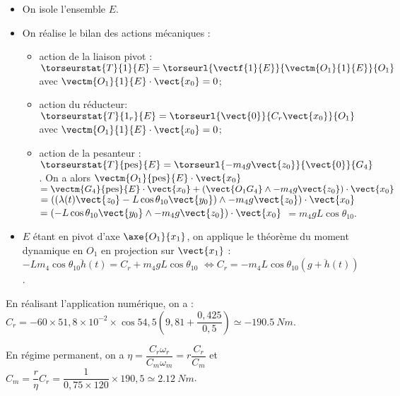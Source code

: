 \ifprof
\begin{corrige}
\begin{itemize}
\item On isole l'ensemble $E$.
\item On réalise le bilan des actions mécaniques : 
\begin{itemize}
\item action de la liaison pivot : $\torseurstat{T}{1}{E}=\torseurl{\vectf{1}{E}}{\vectm{O_1}{1}{E}}{O_1}$ avec $\vectm{O_1}{1}{E}\cdot \vect{x_0}=0$;
\item action du réducteur: $\torseurstat{T}{1_r}{E}=\torseurl{\vect{0}}{C_r \vect{x_0}}{O_1}$ avec $\vectm{O_1}{1}{E}\cdot \vect{x_0}=0$;
\item action de la pesanteur : 
$\torseurstat{T}{\text{pes}}{E}=\torseurl{-m_4g\vect{z_0}}{\vect{0}}{G_4}$. On a alors 
$\vectm{O_1}{\text{pes}}{E}\cdot \vect{x_0}$ $=\vectm{G_4}{\text{pes}}{E}\cdot \vect{x_0}+\left(\vect{O_1G_4}\wedge -m_4g\vect{z_0} \right)\cdot \vect{x_0}$  
$=\left(\left(\lambda(t)\vect{z_0}-L\cos\theta_{10}\vect{y_0}\right)\wedge -m_4g\vect{z_0} \right)\cdot \vect{x_0}$ 
$=\left(-L\cos\theta_{10}\vect{y_0}\wedge -m_4g\vect{z_0}\right)\cdot \vect{x_0}$ $= m_4gL\cos\theta_{10}$.
\end{itemize}
\item $E$ étant en pivot d'axe $\axe{O_1}{{x_1}}$, on applique le théorème du moment dynamique en $O_1$ en projection sur $\vect{x_1}$ :
$-Lm_4\cos\theta_{10}\ddot{h}(t) =C_r +m_4gL\cos\theta_{10}$
$ \Leftrightarrow C_r=-m_4 L \cos\theta_{10} \left(g+\ddot{h}(t)\right) $. 
\end{itemize}

En réalisant l'application numérique, on a : $C_r = - 60 \times 51,8\times 10^{-2}\times \cos 54,5 \left(9,81 +\dfrac{0,425}{0,5} \right) \simeq -\SI{190,5}{Nm} $.


\end{corrige}

\else
\fi

\ifprof
\begin{corrige}
En régime permanent, on a $\eta=\dfrac{C_r \omega_r}{C_m \omega_m}=r\dfrac{C_r}{C_m}$ et $C_m = \dfrac{r}{\eta}C_r=\dfrac{1}{0,75\times 120} \times 190,5 \simeq \SI{2,12}{Nm}$.
\end{corrige}
\else
\fi




